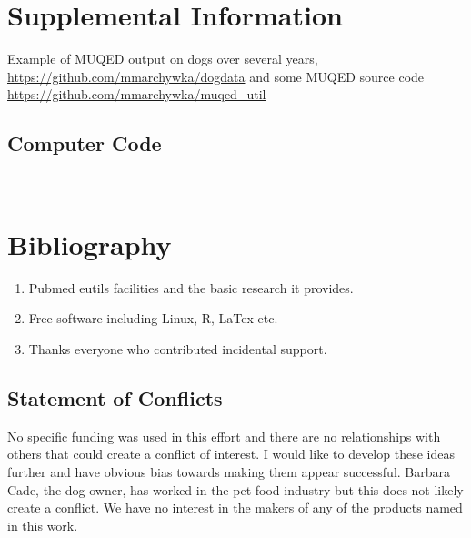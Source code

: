 \section{Supplemental Information}


Example of MUQED output on dogs over several years,
{\url{https://github.com/mmarchywka/dogdata}}
and some MUQED source code
{\url{https://github.com/mmarchywka/muqed_util}}



\subsection{Computer Code}


\begin{lstlisting}


\end{lstlisting}
\section{Bibliography}






\begin{acknowledgments} 

% 
\begin{enumerate}
\item Pubmed eutils facilities and the basic research it provides. 
\item Free software including Linux, R, LaTex  etc.
\item Thanks everyone who contributed incidental support. 
\end{enumerate}

\end{acknowledgments}

\clearpage
\appendix

\begin{mdpicomment}

\section{ Statement of Conflicts }
 No specific funding was used in this effort and there are no relationships
with others that could create a conflict of interest. I would like to develop
these ideas further and have obvious bias towards making them appear 
successful. Barbara Cade, the dog owner, has worked in the pet food industry
but this does not likely create a conflict. We have no interest in the
makers of any of the products named in this work.  

\end{mdpicomment}

